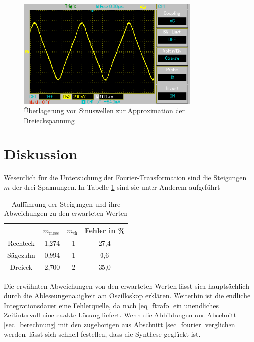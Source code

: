 \begin{figure}[H]
 \includegraphics[width = 0.8\textwidth]{pics/dreieck.png}
 \caption{Überlagerung von Sinuswellen zur Approximation der Dreieckspannung}
 \label{pic_dreieckoszi}
\end{figure}

\section{Diskussion}
Wesentlich für die Untersuchung der Fourier-Transformation sind die Steigungen $m$ der drei Spannungen. In Tabelle \ref{tab_diskus}
sind sie unter Anderem aufgeführt
\begin{table}[H]
 \begin{tabular}{c|c|c|c}
& $m_{\text{mess}}$&	$m_{\text{th}}$&	Fehler in \% \\
\hline
Rechteck&	-1,274&	-1&	27,4\\
Sägezahn&	-0,994&	-1&	0,6\\
Dreieck&	-2,700&	-2&	35,0
 \end{tabular}
\caption{Aufführung der Steigungen und ihre Abweichungen zu den erwarteten Werten}
\label{tab_diskus}
\end{table}
Die erwähnten Abweichungen von den erwarteten Werten lässt sich hauptsächlich durch die Ableseungenauigkeit am Oszilloskop erklären.
Weiterhin ist die endliche Integrationsdauer eine Fehlerquelle, da nach \eqref{eq_ftrafo} ein unendliches Zeitintervall eine exakte
Lösung liefert.
Wenn die Abbildungen aus Abschnitt \ref{sec_berechnung} mit den zugehörigen aus Abschnitt \ref{sec_fourier} verglichen werden, lässt
sich schnell festellen, dass die Synthese geglückt ist.







